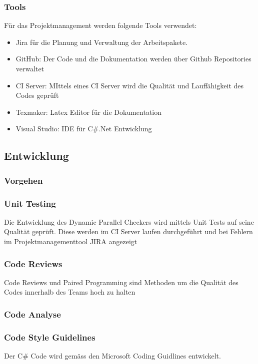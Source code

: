 \documentclass[10pt,a4paper]{article}
\begin{document}
\subsubsection{Tools}
Für das Projektmanagement werden folgende Tools verwendet:
\begin{itemize}
\item Jira für die Planung und Verwaltung der Arbeitspakete.
\item GitHub: Der Code und die Dokumentation werden über Github Repositories verwaltet
\item CI Server: MIttels eines CI Server wird die Qualität und Lauffähigkeit des Codes geprüft
\item Texmaker: Latex Editor für die Dokumentation
\item Visual Studio: IDE für C\#.Net Entwicklung
\end{itemize}
\subsection{Entwicklung}
\subsubsection{Vorgehen}
\subsubsection{Unit Testing}
Die Entwicklung des Dynamic Parallel Checkers wird mittels Unit Tests auf seine Qualität geprüft. Diese werden im CI Server laufen durchgeführt und bei Fehlern im Projektmanagementtool JIRA angezeigt
\subsubsection{Code Reviews}
Code Reviews und Paired Programming sind Methoden um die Qualität des Codes innerhalb des Teams hoch zu halten
\subsubsection{Code Analyse}

\subsubsection{Code Style Guidelines}
Der C\# Code wird gemäss den Microsoft Coding Guidlines entwickelt.
\end{document}
